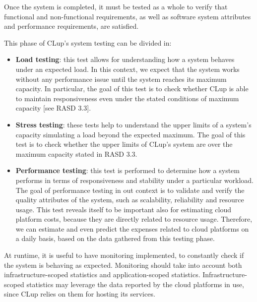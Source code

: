 \documentclass[../../main.tex]{subfiles}
\begin{document}
Once the system is completed, it must be tested as a whole to verify that functional and non-functional requirements, as well as software system attributes and performance requirements, are satisfied.

This phase of CLup's system testing can be divided in:


\begin{itemize}

	\item \textbf{Load testing}: this test allows for understanding how a system behaves under an expected load. 
	In this context, we expect that the system works without any performance issue until the system reaches its maximum capacity. 
	In particular, the goal of this test is to check whether CLup is able to maintain responsiveness even under the stated conditions of maximum capacity [see RASD 3.3].

	\item \textbf{Stress testing}: these tests help to understand the upper limits of a system's capacity simulating a load beyond the expected maximum. 
	The goal of this test is to check whether the upper limits of CLup's system are over the maximum capacity stated in RASD 3.3.

	\item \textbf{Performance testing}: this test is performed to determine how a system performs in terms of responsiveness and stability under a particular workload. 
	The goal of performance testing in out context is to validate and verify the quality attributes of the system, such as scalability, reliability and resource usage. 
	This test reveals itself to be important also for estimating cloud platform costs, because they are directly related to resource usage. 
	Therefore, we can estimate and even predict the expenses related to cloud platforms on a daily basis, based on the data gathered from this testing phase. 

\end{itemize} 

At runtime, it is useful to have monitoring implemented, to constantly check if the system is behaving as expected. 
Monitoring should take into account both infrastructure-scoped statistics and application-scoped statistics. Infrastructure-scoped statistics may leverage the data reported by the cloud platforms in use, since CLup relies on them for hosting its services.

\end{document}
